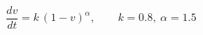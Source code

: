 \begin{equation}
  \frac{dv}{dt} = k\,(1 - v)^{\alpha}, \qquad k = 0.8,\ \alpha = 1.5
\end{equation}
